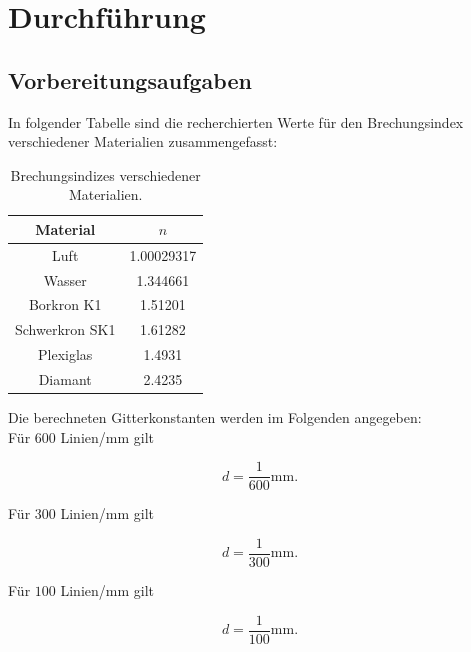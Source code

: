 \section{Durchführung}
\label{sec:Durchführung}

\subsection{Vorbereitungsaufgaben}
\label{sec:vorbereitung}
In folgender Tabelle sind die recherchierten Werte für den Brechungsindex verschiedener Materialien zusammengefasst:
\begin{table}[H]
  \centering
  \caption{Brechungsindizes verschiedener Materialien.}
  \label{tab:brechungsind}
  \begin{tabular}{S S}
    \toprule
    {Material} & {$n$} \\
    \midrule
    {Luft}            & 1.00029317 \\
    {Wasser}          & 1.344661 \\
    {Borkron K1}      & 1.51201 \\
    {Schwerkron SK1}  & 1.61282 \\
    {Plexiglas}       & 1.4931 \\
    {Diamant}         & 2.4235 \\
    \bottomrule
  \end{tabular}
\end{table}

\noindent
Die berechneten Gitterkonstanten werden im Folgenden angegeben:
\\
Für $600$ Linien/$\si{\milli\meter}$ gilt

\begin{equation}
  d = \frac{1}{600} \si{\milli\meter}.
\end{equation}
\noindent

Für $300$ Linien/$\si{\milli\meter}$ gilt

\begin{equation}
  d = \frac{1}{300} \si{\milli\meter}.
\end{equation}
\noindent

Für $100$ Linien/$\si{\milli\meter}$ gilt

\begin{equation}
  d = \frac{1}{100} \si{\milli\meter}.
\end{equation}
\noindent

